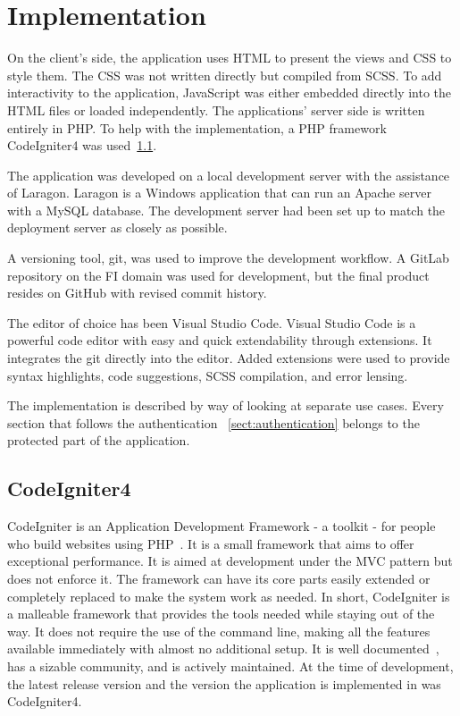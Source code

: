 \documentclass[
  digital,     %
  oneside,     %
  nosansbold,  %
  colorbold, %
  lof,         %
  lot,         %
]{fithesis4}
\begin{document}
\chapter{Implementation}

On the client's side, the application uses HTML to present the views and CSS to style them. The CSS was not written directly but compiled from SCSS. To add interactivity to the application, JavaScript was either embedded directly into the HTML files or loaded independently. The applications' server side is written entirely in PHP. To help with the implementation, a PHP framework CodeIgniter4 was used~\ref{sect:codeigniter}.

The application was developed on a local development server with the assistance of Laragon. Laragon is a Windows application that can run an Apache server with a MySQL database. The development server had been set up to match the deployment server as closely as possible.

A versioning tool, git, was used to improve the development workflow. A GitLab repository on the FI domain was used for development, but the final product resides on GitHub with revised commit history.

The editor of choice has been Visual Studio Code. Visual Studio Code is a powerful code editor with easy and quick extendability through extensions. It integrates the git directly into the editor. Added extensions were used to provide syntax highlights, code suggestions, SCSS compilation, and error lensing.

The implementation is described by way of looking at separate use cases. Every section that follows the authentication ~\ref{sect:authentication} belongs to the protected part of the application. 

\section{CodeIgniter4}
\label{sect:codeigniter}

CodeIgniter is an Application Development Framework - a toolkit - for people who build websites using PHP~\cite{codeigniter}. It is a small framework that aims to offer exceptional performance. It is aimed at development under the MVC pattern but does not enforce it. The framework can have its core parts easily extended or completely replaced to make the system work as needed. In short, CodeIgniter is a malleable framework that provides the tools needed while staying out of the way. It does not require the use of the command line, making all the features available immediately with almost no additional setup. It is well documented~\cite{codeigniter4}, has a sizable community, and is actively maintained. At the time of development, the latest release version and the version the application is implemented in was CodeIgniter4. 
\end{document}
